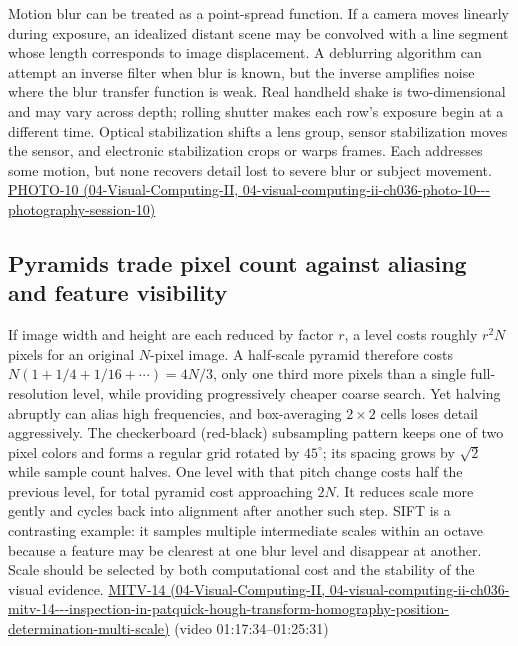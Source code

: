 Motion blur can be treated as a point-spread function. If a camera moves linearly during exposure, an idealized distant scene may be convolved with a line segment whose length corresponds to image displacement. A deblurring algorithm can attempt an inverse filter when blur is known, but the inverse amplifies noise where the blur transfer function is weak. Real handheld shake is two-dimensional and may vary across depth; rolling shutter makes each row's exposure begin at a different time. Optical stabilization shifts a lens group, sensor stabilization moves the sensor, and electronic stabilization crops or warps frames. Each addresses some motion, but none recovers detail lost to severe blur or subject movement. \href{../04-Visual-Computing-II/main.pdf\#nameddest=04-visual-computing-ii-ch036-photo-10---photography-session-10}{PHOTO-10 (04-Visual-Computing-II, 04-visual-computing-ii-ch036-photo-10-\/-\/-photography-session-10)}

\subsection{Pyramids trade pixel count against aliasing and feature visibility}\label{03-visual-computing-i-ch004-pyramids-trade-pixel-count-against-aliasing-and-feature-visibility}

If image width and height are each reduced by factor \(r\), a level costs roughly \(r^2N\) pixels for an original \(N\)-pixel image. A half-scale pyramid therefore costs \(N(1+1/4+1/16+\cdots)=4N/3\), only one third more pixels than a single full-resolution level, while providing progressively cheaper coarse search. Yet halving abruptly can alias high frequencies, and box-averaging \(2\times2\) cells loses detail aggressively. The checkerboard (red-black) subsampling pattern keeps one of two pixel colors and forms a regular grid rotated by \(45^\circ\); its spacing grows by \(\sqrt2\) while sample count halves. One level with that pitch change costs half the previous level, for total pyramid cost approaching \(2N\). It reduces scale more gently and cycles back into alignment after another such step. SIFT is a contrasting example: it samples multiple intermediate scales within an octave because a feature may be clearest at one blur level and disappear at another. Scale should be selected by both computational cost and the stability of the visual evidence. \href{../04-Visual-Computing-II/main.pdf\#nameddest=04-visual-computing-ii-ch036-mitv-14---inspection-in-patquick-hough-transform-homography-position-determination-multi-scale}{MITV-14 (04-Visual-Computing-II, 04-visual-computing-ii-ch036-mitv-14-\/-\/-inspection-in-patquick-hough-transform-homography-position-determination-multi-scale)} (video 01:17:34--01:25:31)

